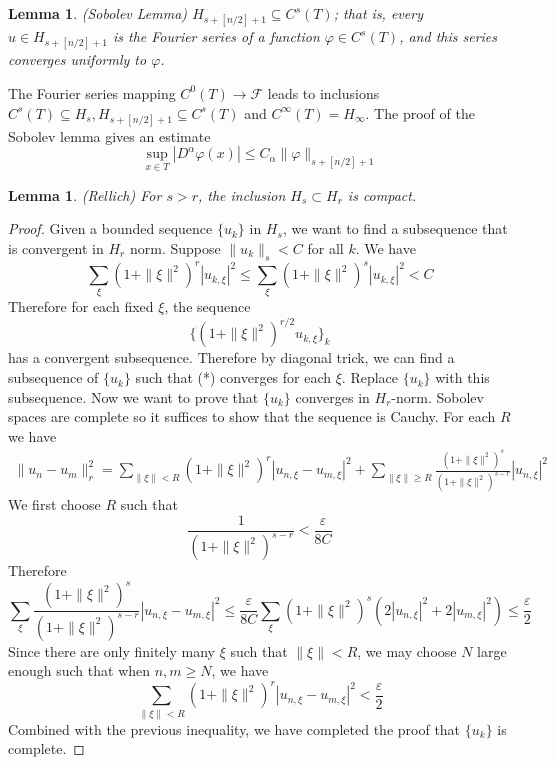 \documentclass[12pt]{article}
\theoremstyle{plain}
\newtheorem{lemma}[equation]{Lemma}
\theoremstyle{definition}
\newcommand{\<}{\langle}
\renewcommand{\>}{\rangle}
\newcommand{\sm}{\varepsilon}
\newcommand{\shF}{\mathscr{F}}
\begin{document}
\begin{lemma}\emph{(Sobolev Lemma)} $H_{s + [n/2] + 1} \subseteq C^s(T)$; that is, every $u \in H_{s + [n/2] + 1}$ is the Fourier series of a function $\varphi \in C^s(T)$, and this series converges uniformly to $\varphi$. 
\end{lemma}

The Fourier series mapping $C^0(T) \to \shF$ leads to inclusions $C^s(T) \subseteq H_s, H_{s + [n/2] + 1} \subseteq C^s(T)$ and $C^\infty(T) = H_\infty$. 
The proof of the Sobolev lemma gives an estimate 
$$ \sup_{x \in T} |D^\alpha \varphi(x)| \le C_\alpha \| \varphi \|_{s + [n/2] + 1} $$ 

\begin{lemma}\emph{(Rellich)} 
For $s > r$, the inclusion $H_s \subset H_r$ is compact. 
\end{lemma}
\begin{proof}
Given a bounded sequence $\{ u_k \}$ in $H_s$, we want to find a subsequence that is convergent in $H_r$ norm. Suppose $\| u_k \|_s < C$ for all $k$. We have 
$$ \sum_\xi (1 + \| \xi \|^2)^r |u_{k, \xi}|^2 \le \sum_\xi (1 + \| \xi \|^2)^s |u_{k, \xi}|^2 < C $$
Therefore for each fixed $\xi$, the sequence 
\begin{equation}\tag{*} \{ (1 + \| \xi \|^2)^{r/2} u_{k, \xi} \}_k \end{equation}
has a convergent subsequence. Therefore by diagonal trick, we can find a subsequence of $\{ u_k \}$ such that (*) converges for each $\xi$. Replace $\{ u_k \}$ with this subsequence. Now we want to prove that $\{ u_k \}$ converges in $H_r$-norm. Sobolev spaces are complete so it suffices to show that the sequence is Cauchy. For each $R$ we have 
\begin{align*}
\| u_n - u_m \|_r^2 = \sum_{\| \xi \| < R} (1 + \| \xi \|^2)^r |u_{n, \xi} - u_{m, \xi}|^2 + \sum_{\| \xi \| \ge R} \frac{(1 + \| \xi \|^2)^s}{(1 + \| \xi \|^2)^{s - r}} |u_{n, \xi}|^2  
\end{align*}
We first choose $R$ such that 
$$ \frac{1}{(1 + \| \xi \|^2)^{s - r}} < \frac{\sm}{8 C} $$ Therefore $$ \sum_{\xi} \frac{(1 + \| \xi \|^2)^s}{(1 + \| \xi \|^2)^{s - r}} |u_{n, \xi} - u_{m, \xi}|^2 \le \frac{\sm}{8 C} \sum_{\xi} (1 + \| \xi \|^2)^s (2 |u_{n, \xi}|^2 + 2 |u_{m, \xi}|^2 ) \le \frac{\sm}{2}$$
Since there are only finitely many $\xi$ such that $\| \xi \| < R$, we may choose $N$ large enough such that when $n, m \ge N$, we have 
$$ \sum_{\| \xi \| < R} (1 + \| \xi \|^2)^r |u_{n, \xi} - u_{m, \xi}|^2 < \frac{\sm}{2} $$
Combined with the previous inequality, we have completed the proof that $\{ u_k \}$ is complete. 
\end{proof}
\end{document}
